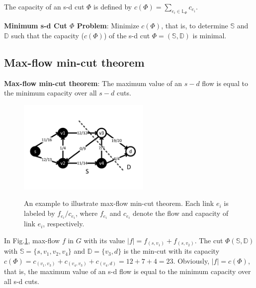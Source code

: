 The capacity of an s-d cut $\Phi$ is defined by $c(\Phi)=\sum\limits_{e_i\in \mathbb{\mathbb{L}}_{\Phi}}c_{e_i}$.

\textbf{Minimum s-d Cut $\Phi$ Problem}: Minimize $c(\Phi)$, that is, to determine $\mathbb{S}$ and $\mathbb{D}$ such that the capacity ($c(\Phi)$) of the s-d cut ${\Phi}=(\mathbb{S},\mathbb{D})$ is minimal.


\subsection{Max-flow min-cut theorem}
\textbf{Max-flow min-cut theorem}: The maximum value of an $s-d$ flow is equal to the minimum capacity over all $s-d$ cuts.
\begin{figure}[tp]
  \centering
  \includegraphics[width=2.5in]{franz//FlowNetwork}\\
  \caption{An example to illustrate max-flow min-cut theorem. Each link $e_i$ is labeled by $f_{e_i}/c_{e_i}$, where $f_{e_i}$ and $c_{e_i}$ denote the flow and capacity of link $e_i$, respectively.   }
  \label{fig:FlowNetwork}
\end{figure}
In Fig.\ref{fig:FlowNetwork}, max-flow $f$ in $G$ with its value $|f|=f_{(s,v_1)}+f_{(s,v_2)}$. The cut $\Phi(\mathbb{S},\mathbb{D})$ with $\mathbb{S}=\{s,v_1,v_2,v_4\}$ and $\mathbb{D}=\{v_3,d\}$ is the min-cut with its capacity $c(\Phi)=c_{(v_1,v_3)}+c_{(v_4,v_3)}+c_{(v_4,d)}=12+7+4=23$. Obviously, $|f|=c(\Phi)$, that is, the maximum value of an s-d flow is equal to the minimum capacity over all s-d cuts.

